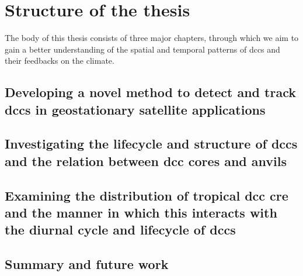 




\section{Structure of the thesis}

The body of this thesis consists of three major chapters, through which we aim to gain a better understanding of the spatial and temporal patterns of \acrshort{dcc}s and their feedbacks on the climate.


\subsection{Developing a novel method to detect and track \acrshort{dcc}s in geostationary satellite applications}

\subsection{Investigating the lifecycle and structure of \acrshort{dcc}s and the relation between \acrshort{dcc} cores and anvils}

\subsection{Examining the distribution of tropical \acrshort{dcc} \acrshort{cre} and the manner in which this interacts with the diurnal cycle and lifecycle of \acrshort{dcc}s}

\subsection{Summary and future work}
